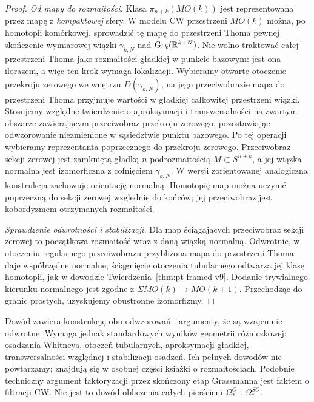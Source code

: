 \begin{proof}
\emph{Od mapy do rozmaitości.}
Klasa $\pi_{n+k}(MO(k))$ jest reprezentowana
przez mapę z \emph{kompaktowej} sfery. W modelu
CW przestrzeni $MO(k)$ można, po homotopii
komórkowej, sprowadzić tę mapę do przestrzeni
Thoma pewnej skończenie wymiarowej wiązki
$\gamma_{k,N}$ nad $\mathrm{Gr}_k(\mathbb{R}^{k+N})$.
Nie wolno traktować całej przestrzeni Thoma jako
rozmaitości gładkiej w punkcie bazowym: jest ona
ilorazem, a więc ten krok wymaga lokalizacji.
Wybieramy otwarte otoczenie przekroju zerowego
we wnętrzu $D(\gamma_{k,N})$; na jego przeciwobrazie
mapa do przestrzeni Thoma przyjmuje wartości
w gładkiej całkowitej przestrzeni wiązki.
Stosujemy względne twierdzenie o aproksymacji
i transwersalności na zwartym obszarze zawierającym
przeciwobraz przekroju zerowego, pozostawiając
odwzorowanie niezmienione w sąsiedztwie punktu bazowego.
Po tej operacji wybieramy reprezentanta poprzecznego
do przekroju zerowego. Przeciwobraz sekcji zerowej
jest zamkniętą gładką
$n$-podrozmaitością $M\subset S^{n+k}$, a jej
wiązka normalna jest izomorficzna z cofnięciem
$\gamma_{k,N}$. W wersji zorientowanej analogiczna
konstrukcja zachowuje orientację normalną.
Homotopię map można uczynić poprzeczną do sekcji
zerowej względnie do końców; jej przeciwobraz jest
kobordyzmem otrzymanych rozmaitości.

\emph{Sprawdzenie odwrotności i stabilizacji.}
Dla map ściągających przeciwobraz sekcji zerowej
to początkowa rozmaitość wraz z daną wiązką normalną.
Odwrotnie, w otoczeniu regularnego przeciwobrazu
przybliżona mapa do przestrzeni Thoma daje współrzędne
normalne; ściągnięcie otoczenia tubularnego odtwarza
jej klasę homotopii, jak w dowodzie
Twierdzenia~\ref{thm:pt-framed-v9}.
Dodanie trywialnego kierunku normalnego jest zgodne
z $\Sigma MO(k)\to MO(k+1)$. Przechodząc do granic
prostych, uzyskujemy obustronne izomorfizmy.
\end{proof}

\begin{uwaga}
Dowód zawiera konstrukcję obu odwzorowań i argumenty,
że są wzajemnie odwrotne. Wymaga jednak standardowych
wyników geometrii różniczkowej: osadzania Whitneya,
otoczeń tubularnych, aproksymacji gładkiej,
transwersalności względnej i stabilizacji osadzeń.
Ich pełnych dowodów nie powtarzamy; znajdują się
w osobnej części książki o rozmaitościach. Podobnie
techniczny argument faktoryzacji przez skończony
etap Grassmanna jest faktem o filtracji CW.
Nie jest to dowód obliczenia całych pierścieni
$\Omega_*^O$ i $\Omega_*^{SO}$.
\end{uwaga}



